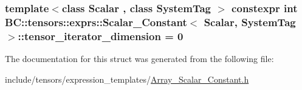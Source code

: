 \subsubsection[{\texorpdfstring{tensor\+\_\+iterator\+\_\+dimension}{tensor_iterator_dimension}}]{\setlength{\rightskip}{0pt plus 5cm}template$<$class Scalar , class System\+Tag $>$ constexpr int {\bf B\+C\+::tensors\+::exprs\+::\+Scalar\+\_\+\+Constant}$<$ {\bf Scalar}, System\+Tag $>$\+::tensor\+\_\+iterator\+\_\+dimension = 0\hspace{0.3cm}{\ttfamily [static]}}\hypertarget{structBC_1_1tensors_1_1exprs_1_1Scalar__Constant_a51b6300b3b89c7782b7f346f18504a56}{}\label{structBC_1_1tensors_1_1exprs_1_1Scalar__Constant_a51b6300b3b89c7782b7f346f18504a56}


The documentation for this struct was generated from the following file\+:\begin{DoxyCompactItemize}
\item 
include/tensors/expression\+\_\+templates/\hyperlink{Array__Scalar__Constant_8h}{Array\+\_\+\+Scalar\+\_\+\+Constant.\+h}\end{DoxyCompactItemize}
